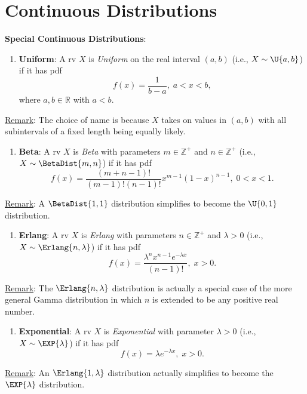 \section*{Continuous Distributions}
\textbf{Special Continuous Distributions}:
\begin{Regular}
    \begin{enumerate}[1.]
        \item \textbf{Uniform}: A rv $ X $ is \emph{Uniform} on the real interval $ (a,b) $ (i.e., $ X \sim \U{a,b} $) if it has pdf
              \[ f(x)=\frac{1}{b-a},\; a<x<b, \]
              where $ a,b\in\mathbb{R} $ with $ a<b $.
    \end{enumerate}
    \tcblower{}
    \underline{Remark}: The choice of name is because $ X $ takes on values in $ (a,b) $ with all subintervals of a fixed length being equally likely.
\end{Regular}
\begin{Regular}
    \begin{enumerate}[2.]
        \item \textbf{Beta}: A rv $ X $ is \emph{Beta} with parameters $ m\in\mathbb{Z}^+ $ and $ n\in\mathbb{Z}^+ $ (i.e., $ X \sim \BetaDist{m,n} $)
              if it has pdf
              \[ f(x)=\frac{(m+n-1)!}{(m-1)!(n-1)!}x^{m-1}(1-x)^{n-1},\; 0<x<1.  \]
    \end{enumerate}
    \tcblower{}
    \underline{Remark}: A $ \BetaDist{1,1} $ distribution simplifies to become the $ \U{0,1} $ distribution.
\end{Regular}
\begin{Regular}
    \begin{enumerate}[3.]
        \item \textbf{Erlang}: A rv $ X $ is \emph{Erlang} with parameters $ n\in\mathbb{Z}^+ $ and $ \lambda>0 $ (i.e., $ X \sim \Erlang{n,\lambda} $)
              if it has pdf
              \[ f(x)=\frac{\lambda^n x^{n-1}e^{-\lambda x}}{(n-1)!} ,\; x>0. \]
    \end{enumerate}
    \tcblower{}
    \underline{Remark}: The $ \Erlang{n,\lambda} $ distribution is actually a special case of the more general
    Gamma distribution in which $ n $ is extended to be any positive real number.
\end{Regular}
\begin{Regular}
    \begin{enumerate}[4.]
        \item \textbf{Exponential}: A rv $ X $ is \emph{Exponential} with parameter $ \lambda>0 $ (i.e., $ X \sim \EXP{\lambda} $)
              if it has pdf
              \[ f(x)=\lambda e^{-\lambda x},\; x>0. \]
    \end{enumerate}
    \tcblower{}
    \underline{Remark}: An $ \Erlang{1,\lambda} $ distribution actually simplifies to become the $ \EXP{\lambda} $ distribution.
\end{Regular}
